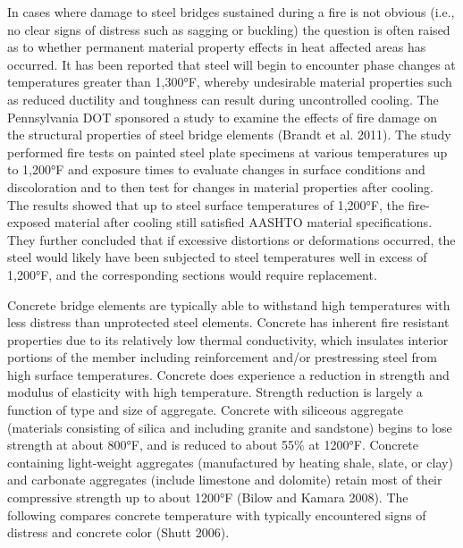 In cases where damage to steel bridges sustained during a fire is not obvious (i.e., no clear signs of distress such
as sagging or buckling) the question is often raised as to whether permanent material property effects in heat affected
areas has occurred. It has been reported that steel will begin to encounter phase changes at temperatures greater than
1,300°F, whereby undesirable material properties such as reduced ductility and toughness can result during
uncontrolled cooling. The Pennsylvania DOT sponsored a study to examine the effects of fire damage on the
structural properties of steel bridge elements (Brandt et al. 2011). The study performed fire tests on painted steel
plate specimens at various temperatures up to 1,200°F and exposure times to evaluate changes in surface conditions
and discoloration and to then test for changes in material properties after cooling. The results showed that up to steel
surface temperatures of 1,200°F, the fire-exposed material after cooling still satisfied AASHTO material
specifications. They further concluded that if excessive distortions or deformations occurred, the steel would likely
have been subjected to steel temperatures well in excess of 1,200°F, and the corresponding sections would require
replacement.

Concrete bridge elements are typically able to withstand high temperatures with less distress than unprotected
steel elements. Concrete has inherent fire resistant properties due to its relatively low thermal conductivity, which
insulates interior portions of the member including reinforcement and/or prestressing steel from high surface
temperatures. Concrete does experience a reduction in strength and modulus of elasticity with high temperature.
Strength reduction is largely a function of type and size of aggregate. Concrete with siliceous aggregate (materials
consisting of silica and including granite and sandstone) begins to lose strength at about 800°F, and is reduced to about 55\% at 1200°F. Concrete containing light-weight aggregates (manufactured by heating shale, slate, or clay)
and carbonate aggregates (include limestone and dolomite) retain most of their compressive strength up to about
1200°F (Bilow and Kamara 2008). The following compares concrete temperature with typically encountered signs
of distress and concrete color (Shutt 2006).

